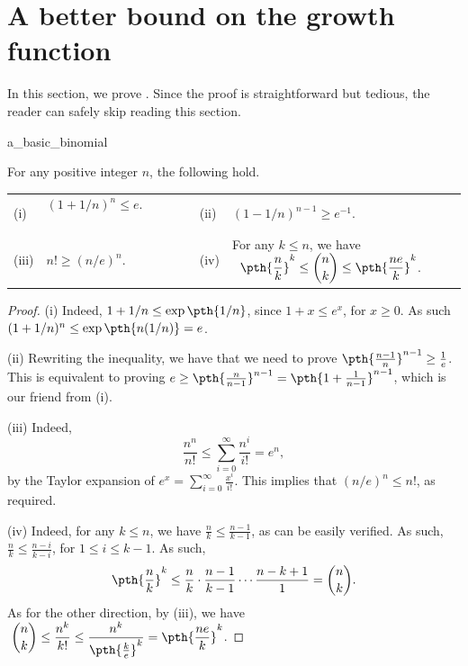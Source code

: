 \section{A better bound on the growth function}

In this section, we prove . Since the
proof is straightforward but tedious, the reader can safely skip
reading this section.

\begin{fragment}{a_basic_binomial}
    \begin{lemma}
        For any positive integer $n$, the following hold.
        
        \medskip
        
        \begin{tabular}{llll}
            (i) & $(1+1/n)^n \leq e$. ~~~~~~~~~~~~~~~~~~
            & 
            (ii) & $(1-1/n)^{n-1} \geq e^{-1}$.\\
            (iii) &$n! \geq (n/e)^n$.&
            (iv) & For any $k \leq n$, we have $\;\;\displaystyle
            \pth{\frac{n}{k}}^k \leq \binom{n}{k} \leq \pth{\frac{n
                  e}{k}}^k$.
        \end{tabular}
        
    \end{lemma}
\end{fragment}

\begin{proof}
    (i) Indeed, $1+1/n\leq \exp \pth{1/n}$, since $1+x \leq e^x$, for
    $x \geq 0$. As such $(1+1/n)^n \leq \exp\pth{n(1/n)} = e$.
    
    (ii) Rewriting the inequality, we have that we need to prove
    $\pth{\frac{n-1}{n}}^{n-1} \geq \frac{1}{e}$. This is equivalent
    to proving $e \geq \pth{\frac{n}{n-1}}^{n-1} = \pth{
       1+\frac{1}{n-1}}^{n-1}$, which is our friend from (i).
    
    (iii) Indeed,
    \begin{equation*}
        \frac{n^n}{n!} \leq \sum_{i=0}^{\infty} \frac{n^i}{i!} = e^n,        
    \end{equation*}
    by the Taylor expansion of $e^x = \sum_{i=0}^\infty
    \frac{x^i}{i!}$. This implies that $(n/e)^n \leq n!$, as required.
    
    (iv) Indeed, for any $k \leq n$, we have $\frac{n}{k} \leq
    \frac{n-1}{k-1}$, as can be easily verified. As such, $\frac{n}{k}
    \leq \frac{n-i}{k-i}$, for $1 \leq i \leq k-1$. As such,
    \begin{equation*}
        \pth{\frac{n}{k}}^k \leq \frac{n}{k} \cdot \frac{n-1}{k-1} \cdots
        \frac{n-k+1} {1} = \binom{n}{k}.        
    \end{equation*}
    As for the other direction, by (iii), we have $\displaystyle\;
    \binom{n}{k} \leq \frac{n^k}{k!} \leq
    \frac{n^k}{\pth{\frac{k}{e}}^{k}} = \pth{ \frac{n e}{k} }^k$.
\end{proof}

